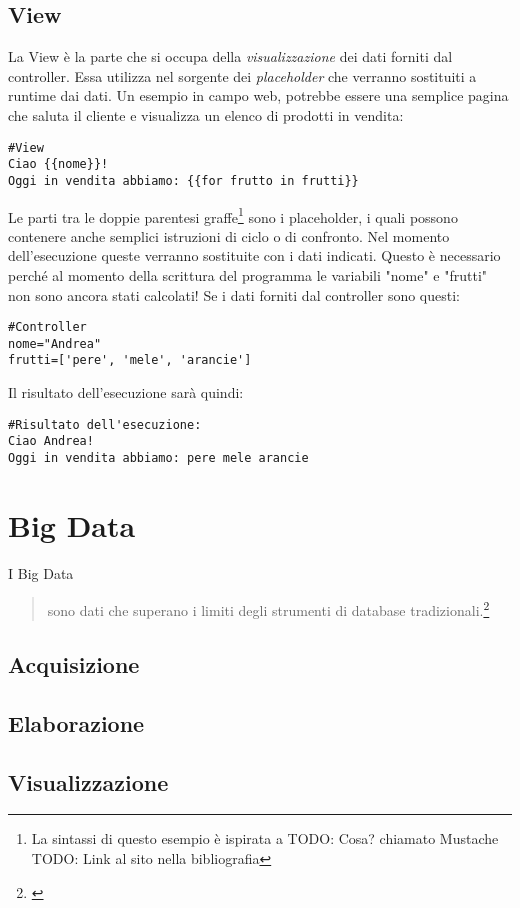 \subsection{View}
La View è la parte che si occupa della \emph{visualizzazione} dei dati forniti dal controller. Essa utilizza nel sorgente dei \emph{placeholder} che verranno sostituiti a runtime dai dati.
Un esempio in campo web, potrebbe essere una semplice pagina che saluta il cliente e visualizza un elenco di prodotti in vendita:
\begin{verbatim}
#View
Ciao {{nome}}!
Oggi in vendita abbiamo: {{for frutto in frutti}}
\end{verbatim}
Le parti tra le doppie parentesi graffe\footnote{La sintassi di questo esempio è ispirata a TODO: Cosa? chiamato Mustache TODO: Link al sito nella bibliografia} sono i placeholder, i quali possono contenere anche semplici istruzioni di ciclo o di confronto. Nel momento dell'esecuzione queste verranno sostituite con i dati indicati. Questo è necessario perché al momento della scrittura del programma le variabili "nome" e "frutti" non sono ancora stati calcolati!
Se i dati forniti dal controller sono questi:
\begin{verbatim}
#Controller
nome="Andrea"
frutti=['pere', 'mele', 'arancie']
\end{verbatim}
Il risultato dell'esecuzione sarà quindi:
\begin{verbatim}
#Risultato dell'esecuzione:
Ciao Andrea!
Oggi in vendita abbiamo: pere mele arancie
\end{verbatim}


\section{Big Data}\label{sec:bigdata}
I Big Data
\begin{quotation}
sono dati che superano i limiti degli strumenti di database tradizionali.\footnote{\cite{rezzani2013big}}
\end{quotation} 
\subsection{Acquisizione}
\subsection{Elaborazione}
\subsection{Visualizzazione}